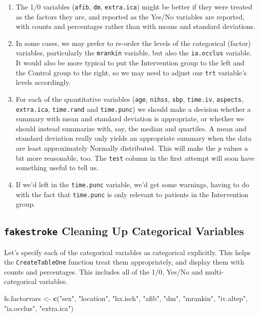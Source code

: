 \documentclass[]{book}
\newenvironment{Shaded}{\begin{snugshade}}{\end{snugshade}}
\newcommand{\KeywordTok}[1]{\textcolor[rgb]{0.13,0.29,0.53}{\textbf{#1}}}
\newcommand{\StringTok}[1]{\textcolor[rgb]{0.31,0.60,0.02}{#1}}
\newcommand{\NormalTok}[1]{#1}
\providecommand{\tightlist}{%
  \setlength{\itemsep}{0pt}\setlength{\parskip}{0pt}}
\theoremstyle{definition}
\theoremstyle{definition}
\theoremstyle{definition}
\theoremstyle{remark}
\begin{document}
\begin{enumerate}
\def\labelenumi{\arabic{enumi}.}
\tightlist
\item
  The 1/0 variables (\texttt{afib}, \texttt{dm}, \texttt{extra.ica})
  might be better if they were treated as the factors they are, and
  reported as the Yes/No variables are reported, with counts and
  percentages rather than with means and standard deviations.
\item
  In some cases, we may prefer to re-order the levels of the categorical
  (factor) variables, particularly the \texttt{mrankin} variable, but
  also the \texttt{ia.occlus} variable. It would also be more typical to
  put the Intervention group to the left and the Control group to the
  right, so we may need to adjust our \texttt{trt} variable's levels
  accordingly.
\item
  For each of the quantitative variables (\texttt{age}, \texttt{nihss},
  \texttt{sbp}, \texttt{time.iv}, \texttt{aspects}, \texttt{extra.ica},
  \texttt{time.rand} and \texttt{time.punc}) we should make a decision
  whether a summary with mean and standard deviation is appropriate, or
  whether we should instead summarize with, say, the median and
  quartiles. A mean and standard deviation really only yields an
  appropriate summary when the data are least approximately Normally
  distributed. This will make the \emph{p} values a bit more reasonable,
  too. The \texttt{test} column in the first attempt will soon have
  something useful to tell us.
\item
  If we'd left in the \texttt{time.punc} variable, we'd get some
  warnings, having to do with the fact that \texttt{time.punc} is only
  relevant to patients in the Intervention group.
\end{enumerate}

\subsection{\texorpdfstring{\texttt{fakestroke} Cleaning Up Categorical
Variables}{fakestroke Cleaning Up Categorical Variables}}\label{fakestroke-cleaning-up-categorical-variables}

Let's specify each of the categorical variables as categorical
explicitly. This helps the \texttt{CreateTableOne} function treat them
appropriately, and display them with counts and percentages. This
includes all of the 1/0, Yes/No and multi-categorical variables.

\begin{Shaded}
\begin{Highlighting}[]
\NormalTok{fs.factorvars <-}\StringTok{ }\KeywordTok{c}\NormalTok{(}\StringTok{"sex"}\NormalTok{, }\StringTok{"location"}\NormalTok{, }\StringTok{"hx.isch"}\NormalTok{, }\StringTok{"afib"}\NormalTok{, }\StringTok{"dm"}\NormalTok{, }
                   \StringTok{"mrankin"}\NormalTok{, }\StringTok{"iv.altep"}\NormalTok{, }\StringTok{"ia.occlus"}\NormalTok{, }\StringTok{"extra.ica"}\NormalTok{)}
\end{Highlighting}
\end{Shaded}
\end{document}
